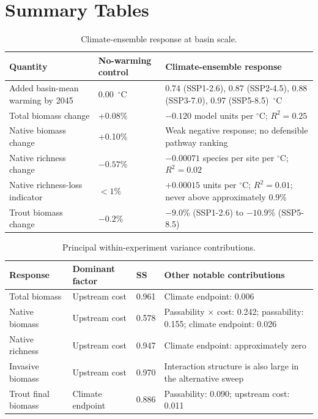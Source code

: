 \documentclass[11pt,a4paper]{article}
\begin{document}
\clearpage
\section{Summary Tables}

\begin{table}[H]
\centering
\caption{Climate-ensemble response at basin scale.}
\small
\begin{tabularx}{\textwidth}{>{\raggedright\arraybackslash}p{}YY}
\toprule
Quantity & No-warming control & Climate-ensemble response \\
\midrule
Added basin-mean warming by 2045 & 0.00~$^\circ$C & 0.74 (SSP1-2.6), 0.87 (SSP2-4.5), 0.88 (SSP3-7.0), 0.97 (SSP5-8.5)~$^\circ$C \\
Total biomass change & +0.08\% & $-0.120$ model units per $^\circ$C; $R^2=0.25$ \\
Native biomass change & +0.10\% & Weak negative response; no defensible pathway ranking \\
Native richness change & $-0.57$\% & $-0.00071$ species per site per $^\circ$C; $R^2=0.02$ \\
Native richness-loss indicator & $<1$\% & $+0.00015$ units per $^\circ$C; $R^2=0.01$; never above approximately 0.9\% \\
Trout biomass change & $-0.2$\% & $-9.0$\% (SSP1-2.6) to $-10.9$\% (SSP5-8.5) \\
\bottomrule
\end{tabularx}
\end{table}

\begin{table}[H]
\centering
\caption{Principal within-experiment variance contributions.}
\small
\begin{tabularx}{\textwidth}{>{\raggedright\arraybackslash}p{}p{}p{}Y}
\toprule
Response & Dominant factor & SS & Other notable contributions \\
\midrule
Total biomass & Upstream cost & 0.961 & Climate endpoint: 0.006 \\
Native biomass & Upstream cost & 0.578 & Passability $\times$ cost: 0.242; passability: 0.155; climate endpoint: 0.026 \\
Native richness & Upstream cost & 0.947 & Climate endpoint: approximately zero \\
Invasive biomass & Upstream cost & 0.970 & Interaction structure is also large in the alternative sweep \\
Trout final biomass & Climate endpoint & 0.886 & Passability: 0.090; upstream cost: 0.011 \\
\bottomrule
\end{tabularx}
\end{table}
\end{document}

